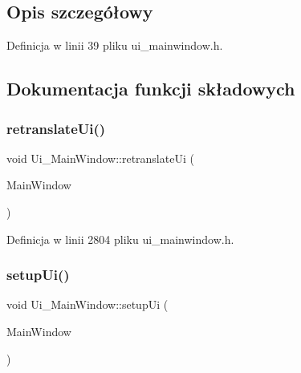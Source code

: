 \subsection{Opis szczegółowy}


Definicja w linii 39 pliku ui\+\_\+mainwindow.\+h.



\subsection{Dokumentacja funkcji składowych}
\mbox{\label{class_ui___main_window_a097dd160c3534a204904cb374412c618}} 
\subsubsection{\texorpdfstring{retranslate\+Ui()}{retranslateUi()}}
{\footnotesize\ttfamily void Ui\+\_\+\+Main\+Window\+::retranslate\+Ui (\begin{DoxyParamCaption}\item[{Q\+Main\+Window $\ast$}]{Main\+Window }\end{DoxyParamCaption})\hspace{0.3cm}{\ttfamily [inline]}}



Definicja w linii 2804 pliku ui\+\_\+mainwindow.\+h.

\mbox{\label{class_ui___main_window_acf4a0872c4c77d8f43a2ec66ed849b58}} 
\subsubsection{\texorpdfstring{setup\+Ui()}{setupUi()}}
{\footnotesize\ttfamily void Ui\+\_\+\+Main\+Window\+::setup\+Ui (\begin{DoxyParamCaption}\item[{Q\+Main\+Window $\ast$}]{Main\+Window }\end{DoxyParamCaption})\hspace{0.3cm}{\ttfamily [inline]}}



